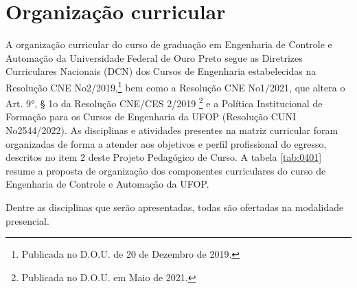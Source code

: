\documentclass[
	12pt,				%
	openright,			%
	oneside,			%
	a4paper,			%
	english,			%
	brazil				%
	]{abntex2}
\begin{document}
\chapter{Organização curricular}
\label{cap:04} 
%
A organização curricular do curso de graduação em Engenharia de Controle e Automação da Universidade Federal de Ouro Preto segue as Diretrizes Curriculares Nacionais (DCN) dos Cursos de Engenharia estabelecidas na Resolução CNE No2/2019,\footnote{Publicada no D.O.U. de 20 de Dezembro de 2019.} bem como a Resolução CNE No1/2021, que altera o Art. 9°, § 1o da Resolução CNE/CES 2/2019 \footnote{Publicada no D.O.U. em Maio de 2021.} e a Política Institucional de Formação para os Cursos de Engenharia da UFOP (Resolução CUNI No2544/2022). As disciplinas e atividades presentes na matriz curricular foram organizadas de forma a atender aos objetivos e perfil profissional do egresso, descritos no item 2 deste Projeto Pedagógico de Curso. A tabela \ref{tab:0401} resume a proposta de organização dos componentes curriculares do curso de Engenharia de Controle e Automação da UFOP.
%
\begin{table}[ht]
	\caption{Organização dos Componentes curriculares}
	\label{tab:0401}
\end{table}

Dentre as disciplinas que serão apresentadas, todas são ofertadas na modalidade presencial.
\end{document}

